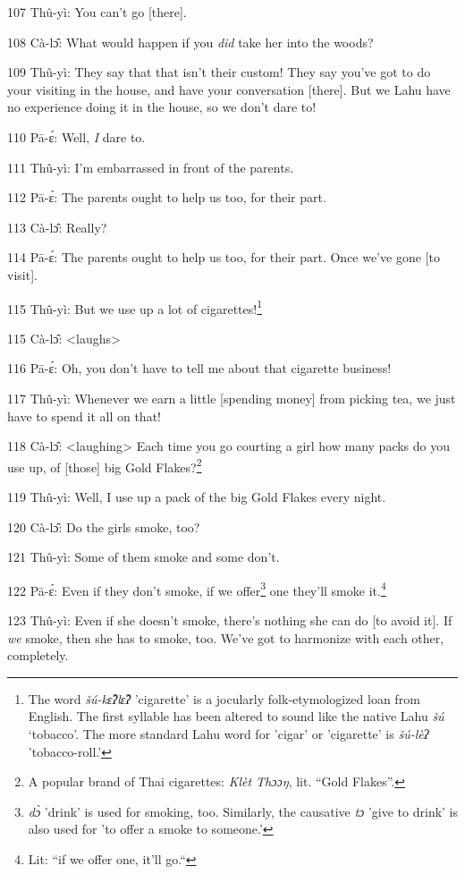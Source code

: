 107 Thû-yì: You can't go [there].

108 Cà-lɔ̂: What would happen if you \textit{did} take her into the woods?

109 Thû-yì: They say that that isn't their custom! They say you've got to do
your visiting in the house, and have your conversation [there]. But we Lahu have
no experience doing it in the house, so we don't dare to!

110 Pā-ɛ́: Well,\textit{ I} dare to.

111 Thû-yì: I'm embarrassed in front of the parents.

112 Pā-ɛ́: The parents ought to help us too, for their part.

113 Cà-lɔ̂: Really?

114 Pā-ɛ́: The parents ought to help us too, for their part. Once we've gone
[to visit].

115 Thû-yì: But we use up a lot of cigarettes!\footnote{The word \textit{šú-kɛ̂ʔlɛ̂ʔ} 'cigarette' is a jocularly folk-etymologized loan from English. The first syllable has been altered to sound like the native Lahu \textit{šú} `tobacco'. The more standard Lahu word for 'cigar' or 'cigarette' is \textit{šú-lèʔ} 'tobacco-roll.'}

115 Cà-lɔ̂: <laughs>

116 Pā-ɛ́: Oh, you don't have to tell me about that cigarette business!

117 Thû-yì: Whenever we earn a little [spending money] from picking tea, we just
have to spend it all on that!

118 Cà-lɔ̂: <laughing> Each time you go courting a girl how
many packs do you use up, of [those] big Gold Flakes?\footnote{A popular brand of Thai cigarettes: \textit{Klèt Thɔɔŋ}, lit. ``Gold Flakes''.}

119 Thû-yì: Well, I use up a pack of the big Gold Flakes every night.

120 Cà-lɔ̂: Do the girls smoke, too?

121 Thû-yì: Some of them smoke and some don't.

122 Pā-ɛ́: Even if they don't smoke, if we offer\footnote{\textit{dɔ̀} 'drink' is used for smoking, too. Similarly, the causative \textit{tɔ} 'give to drink' is also used for 'to offer a smoke to someone.'} one they'll smoke it.\footnote{Lit: ``if we offer one, it'll go.``}

123 Thû-yì: Even if she doesn't smoke, there's nothing she can do [to avoid it].
If \textit{we} smoke, then she has to smoke, too. We've got to harmonize with each
other, completely.

